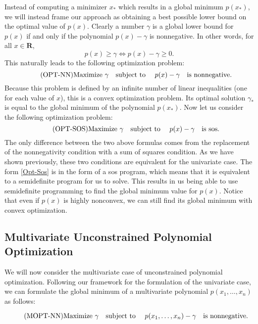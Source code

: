 	Instead of computing a minimizer $x_*$ which results in a global minimum $p(x_*)$, we will instead frame our approach as obtaining a best possible lower bound on the optimal value of $p(x)$. Clearly a number $\gamma$ is a global lower bound for $p(x)$ if and only if the polynomial $p(x) - \gamma$ is nonnegative. In other words, for all $x \in \mathbf{R}$,  
	$$
	p(x) \geq \gamma \iff p(x) - \gamma \geq 0.
	$$
	This naturally leads to the following optimization problem:
	\begin{equation} \label{Opt-Nn} \tag{OPT-NN}
		\textnormal{Maximize } \gamma \quad \textnormal{subject to } \quad p(x) - \gamma \quad \textnormal{is nonnegative}.
	\end{equation}
	Because this problem is defined by an infinite number of linear inequalities (one for each value of $x$), this is a convex optimization problem. Its optimal solution $\gamma_*$ is equal to the global minimum of the polynomial $p(x_*)$. Now let us consider the following optimization problem: 
	\begin{equation} \label{Opt-Sos} \tag{OPT-SOS}
	\textnormal{Maximize } \gamma \quad \textnormal{subject to } \quad p(x) - \gamma \quad \textnormal{is sos}.
	\end{equation}
	The only difference between the two above formulas comes from the replacement of the nonnegativity condition with a sum of squares condition. As we have shown previously, these two conditions are equivalent for the univariate case. The form \eqref{Opt-Sos} is in the form of a sos program, which means that it is equivalent to a semidefinite program for us to solve. This results in us being able to use semidefinite programming to find the global minimum value for $p(x)$. Notice that even if $p(x)$ is highly nonconvex, we can still find its global minimum with convex optimization. 
	
	\subsection{Multivariate Unconstrained Polynomial Optimization}
	
	We will now consider the multivariate case of unconstrained polynomial optimization. Following our framework for the formulation of the univariate case, we can formulate the global minimum of a multivariate polynomial $p(x_1, \dots, x_n)$ as follows:
	
	\begin{equation} \label{Mopt-Nn} \tag{MOPT-NN}
	\textnormal{Maximize } \gamma \quad \textnormal{subject to } \quad p(x_1, \dots, x_n) - \gamma \quad \textnormal{is nonnegative}.
	\end{equation}
	
